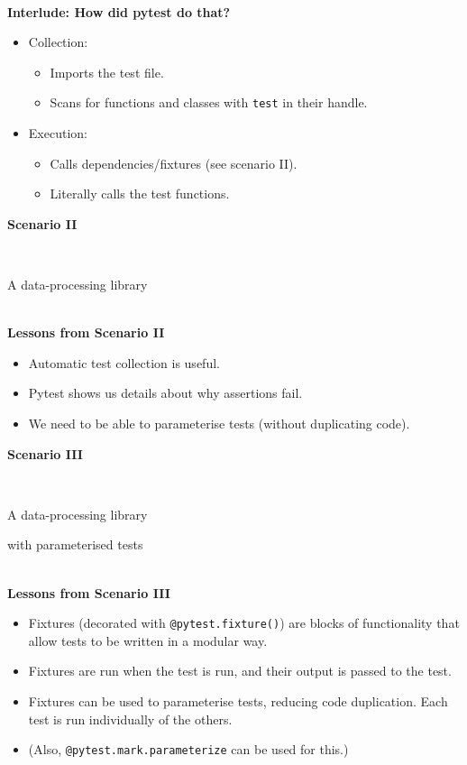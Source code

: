 \documentclass[12pt]{article}
\newlength{\geometrytop}
\newcommand{\slidetitle}[1]{~\\[-0.5ex]{\Large\bf{\color{bold}#1}}\\}
\begin{document}
\slidetitle{Interlude: How did pytest do that?}
\begin{itemize}
\item Collection:
\begin{itemize}
\item Imports the test file.
\item Scans for functions and classes with \verb|test| in their handle.
\end{itemize}
\item Execution:
\begin{itemize}
\item Calls dependencies/fixtures (see scenario II).
\item Literally calls the test functions.
\end{itemize}
\end{itemize}
\clearpage

\thispagestyle{plain}
\vspace*{-\topskip}
\vspace*{\fill}
{\Huge\centerline{\textbf{Scenario II}}~\newline
\centerline{A data-processing library}}
\vspace*{\fill}
\vspace*{\geometrytop}
\clearpage

\slidetitle{Lessons from Scenario II}
\begin{itemize}
\item Automatic test collection is useful.
\item Pytest shows us details about why assertions fail.
\item We need to be able to parameterise tests (without duplicating code).
\end{itemize}
\clearpage

\thispagestyle{plain}
\vspace*{-\topskip}
\vspace*{\fill}
{\Huge\centerline{\textbf{Scenario III}}~\newline
\centerline{A data-processing library}
\centerline{with parameterised tests}}
\vspace*{\fill}
\vspace*{\geometrytop}
\clearpage

\slidetitle{Lessons from Scenario III}
\begin{itemize}
\item Fixtures (decorated with \verb|@pytest.fixture()|) are blocks of
    functionality that allow tests to be written in a modular way.
\item Fixtures are run when the test is run, and their output is passed to the
    test.
\item Fixtures can be used to parameterise tests, reducing code
    duplication. Each test is run individually of the others.
\item (Also, \verb|@pytest.mark.parameterize| can be used for this.)
\end{itemize}
\clearpage
\end{document}
